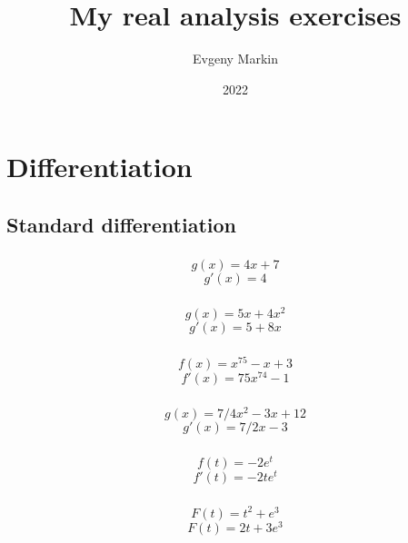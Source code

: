 \documentclass[11pt,oneside,titlepage]{book}
\title{My real analysis exercises}
\author{Evgeny Markin}
\date{2022}
\begin{document}
\maketitle
\tableofcontents

\chapter{Differentiation}

\section{Standard differentiation}

\subsection{}

$$g(x) = 4x + 7$$
$$g'(x) = 4$$

\subsection{}

$$g(x) = 5x + 4x^2$$
$$g'(x) = 5 + 8x$$

\subsection{}

$$f(x) = x^{75} - x + 3$$
$$f'(x) = 75 x^{74} - 1$$

\subsection{}

$$g(x) = 7/4 x^2 - 3x + 12$$
$$g'(x) = 7/2 x - 3$$

\subsection{}

$$f(t) = -2e^t$$
$$f'(t) = -2te^t$$

\subsection{}

$$F(t) = t^2 + e^3$$
$$F(t) = 2t + 3e^3$$

\subsection{}
\end{document}
